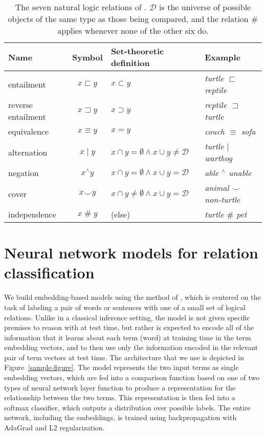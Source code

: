 \documentclass[letterpaper]{article}
\newcommand{\nateq}{\equiv}
\newcommand{\natind}{\mathbin{\#}}
\newcommand{\natneg}{\mathbin{^{\wedge}}}
\newcommand{\natfor}{\sqsubset}
\newcommand{\natrev}{\sqsupset}
\newcommand{\natalt}{\mathbin{|}}
\newcommand{\natcov}{\mathbin{\smallsmile}}
\def\ii#1{\textit{#1}}
\begin{document}
\begin{table*}[tp]
  \centering%
  \setlength{\tabcolsep}{15pt}
  \renewcommand{\arraystretch}{1.2}
  \begin{tabular}{l c l l} 
    \toprule
    Name & Symbol & Set-theoretic definition & Example \\ 
    \midrule
    entailment         & $x \natfor y$   & $x \subset y$ & \ii{turtle $\natfor$ reptile}  \\ 
    reverse entailment & $x \natrev y$   & $x \supset y$ & \ii{reptile $\natrev$ turtle}  \\ 
    equivalence        & $x \nateq y$    & $x = y$       & \ii{couch $\nateq$ sofa} \\ 
    alternation        & $x \natalt y$   & $x \cap y = \emptyset \wedge x \cup y \neq \mathcal{D}$ & \ii{turtle $\natalt$ warthog} \\ 
    negation           & $x \natneg y$   & $x \cap y = \emptyset \wedge x \cup y = \mathcal{D}$    & \ii{able $\natneg$ unable} \\
    cover              & $x \natcov y$   & $x \cap y \neq \emptyset \wedge x \cup y = \mathcal{D}$ & \ii{animal $\natcov$ non-turtle} \\ 
    independence       & $x \natind y$   & (else) & \ii{turtle $\natind$ pet}\\
    \bottomrule
  \end{tabular}
  \protect\caption{\protect\label{b-table}The seven natural logic relations of \protect\cite{maccartney2009extended}. 
    $\mathcal{D}$ is the universe of possible objects of the same type as those being compared, 
    and the relation $\natind$ applies whenever none of the other six do.} 
\end{table*}

\section{Neural network models for relation classification} \label{methods}

We build embedding-based models using the method of
\cite{Bowman:Potts:Manning:2014}, which is centered on the task of
labeling a pair of words or sentences with one of a small set of
logical relations. Unlike in a classical inference
setting, the model is not given specific premises to reason with at test time, but rather
is expected to encode all of the information that it learns about each term (word) at training
time in the term embedding vectors, and to then use only the information encoded in the relevant pair of
term vectors at test time. 
The architecture that we use is depicted in
Figure~\ref{sample-figure}. The model represents the two input terms
as single embedding vectors, which are fed into a comparison function based on one
of two types of neural network layer function to produce a
representation for the relationship between the two terms. This
representation is then fed into a softmax classifier, which outputs a
distribution over possible labels. The entire network, including the
embeddings, is trained using backpropagation with AdaGrad \cite{duchi2011adaptive}
and L2 regularization.
\end{document}
